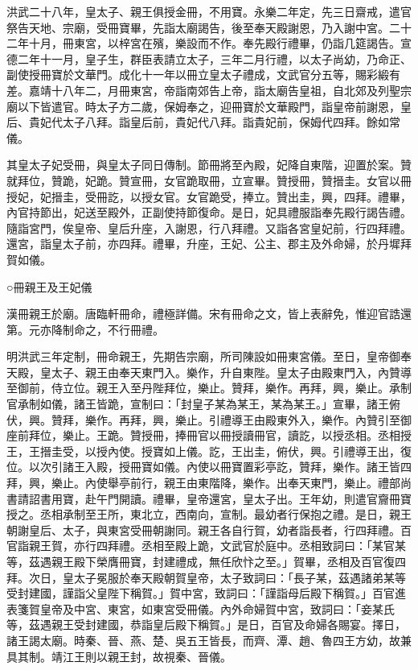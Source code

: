 洪武二十八年，皇太子、親王俱授金冊，不用寶。永樂二年定，先三日齋戒，遣官祭告天地、宗廟，受冊寶畢，先詣太廟謁告，後至奉天殿謝恩，乃入謝中宮。二十二年十月，冊東宮，以梓宮在殯，樂設而不作。奉先殿行禮畢，仍詣几筵謁告。宣德二年十一月，皇子生，群臣表請立太子，三年二月行禮，以太子尚幼，乃命正、副使授冊寶於文華門。成化十一年以冊立皇太子禮成，文武官分五等，賜彩緞有差。嘉靖十八年二，月冊東宮，帝詣南郊告上帝，詣太廟告皇祖，自北郊及列聖宗廟以下皆遣官。時太子方二歲，保姆奉之，迎冊寶於文華殿門，詣皇帝前謝恩，皇后、貴妃代太子八拜。詣皇后前，貴妃代八拜。詣貴妃前，保姆代四拜。餘如常儀。

其皇太子妃受冊，與皇太子同日傳制。節冊將至內殿，妃降自東階，迎置於案。贊就拜位，贊跪，妃跪。贊宣冊，女官跪取冊，立宣畢。贊授冊，贊搢圭。女官以冊授妃，妃搢圭，受冊訖，以授女官。女官跪受，捧立。贊出圭，興，四拜。禮畢，內官持節出，妃送至殿外，正副使持節復命。是日，妃具禮服詣奉先殿行謁告禮。隨詣宮門，俟皇帝、皇后升座，入謝恩，行八拜禮。又詣各宮皇妃前，行四拜禮。還宮，詣皇太子前，亦四拜。禮畢，升座，王妃、公主、郡主及外命婦，於丹墀拜賀如儀。

○冊親王及王妃儀

漢冊親王於廟。唐臨軒冊命，禮極詳備。宋有冊命之文，皆上表辭免，惟迎官誥還第。元亦降制命之，不行冊禮。

明洪武三年定制，冊命親王，先期告宗廟，所司陳設如冊東宮儀。至日，皇帝御奉天殿，皇太子、親王由奉天東門入。樂作，升自東陛。皇太子由殿東門入，內贊導至御前，侍立位。親王入至丹陛拜位，樂止。贊拜，樂作。再拜，興，樂止。承制官承制如儀，諸王皆跪，宣制曰：「封皇子某為某王，某為某王。」宣畢，諸王俯伏，興。贊拜，樂作。再拜，興，樂止。引禮導王由殿東外入，樂作。內贊引至御座前拜位，樂止。王跪。贊授冊，捧冊官以冊授讀冊官，讀訖，以授丞相。丞相授王，王搢圭受，以授內使。授寶如上儀。訖，王出圭，俯伏，興。引禮導王出，復位。以次引諸王入殿，授冊寶如儀。內使以冊寶置彩亭訖，贊拜，樂作。諸王皆四拜，興，樂止。內使舉亭前行，親王由東階降，樂作。出奉天東門，樂止。禮部尚書請詔書用寶，赴午門開讀。禮畢，皇帝還宮，皇太子出。王年幼，則遣官齎冊寶授之。丞相承制至王所，東北立，西南向，宣制。最幼者行保抱之禮。是日，親王朝謝皇后、太子，與東宮受冊朝謝同。親王各自行賀，幼者詣長者，行四拜禮。百官詣親王賀，亦行四拜禮。丞相至殿上跪，文武官於庭中。丞相致詞曰：「某官某等，茲遇親王殿下榮膺冊寶，封建禮成，無任欣忭之至。」賀畢，丞相及百官復四拜。次日，皇太子冕服於奉天殿朝賀皇帝，太子致詞曰：「長子某，茲遇諸弟某等受封建國，謹詣父皇陛下稱賀。」賀中宮，致詞曰：「謹詣母后殿下稱賀。」百官進表箋賀皇帝及中宮、東宮，如東宮受冊儀。內外命婦賀中宮，致詞曰：「妾某氏等，茲遇親王受封建國，恭詣皇后殿下稱賀。」是日，百官及命婦各賜宴。擇日，諸王謁太廟。時秦、晉、燕、楚、吳五王皆長，而齊、潭、趙、魯四王方幼，故兼具其制。靖江王則以親王封，故視秦、晉儀。

